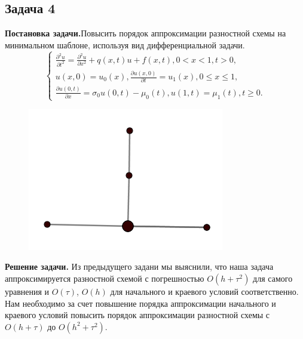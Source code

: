 \documentclass[11pt]{article}
\begin{document}
\subsection*{Задача 4}
\textbf{Постановка задачи.}Повысить порядок аппроксимации разностной схемы на минимальном шаблоне, используя вид дифференциальной задачи.
$$\begin{cases}
    \frac{\partial^2 u}{\partial t^2}=\frac{\partial^2 u}{\partial x^2}+q(x,t)u+f(x,t), 0<x<1,t>0,\\
    u(x,0)=u_0(x),\frac{\partial u(x,0)}{\partial t}=u_1(x), 0 \leq x \leq 1,\\
    \frac{\partial u(0,t)}{\partial x}=\sigma_0 u(0,t)-\mu_0(t),u(1,t)=\mu_1(t),t\geq0.
\end{cases}$$
\begin{figure}
    \centering
    \includegraphics[width=0.35\linewidth]{image3.png}
\end{figure}
\textbf{Решение задачи.} Из предыдущего задани мы выяснили, что наша задача аппроксимируется разностной схемой с погрешностью $O(h+\tau^2)$ для самого уравнения и $O(\tau)$, $O(h)$ для начального и краевого условий соответственно. Нам необходимо за счет повышение порядка аппроксимации начального и краевого условий повысить порядок аппроксимации разностной схемы с $O(h+\tau)$ до $O(h^2+\tau^2)$. 
\end{document}
